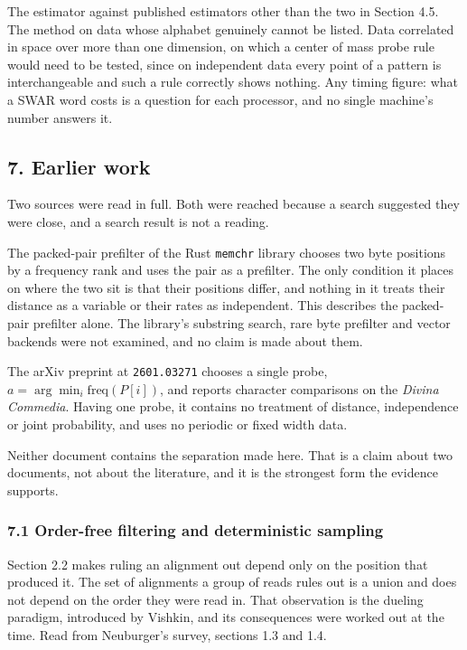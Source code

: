 The estimator against published estimators other than the two in Section 4.5. The method on data whose alphabet genuinely cannot be listed. Data correlated in space over more than one dimension, on which a center of mass probe rule would need to be tested, since on independent data every point of a pattern is interchangeable and such a rule correctly shows nothing. Any timing figure: what a SWAR word costs is a question for each processor, and no single machine's number answers it.

\subsection{7. Earlier work}

Two sources were read in full. Both were reached because a search suggested they were close, and a search result is not a reading.

The packed-pair prefilter of the Rust \texttt{memchr} library chooses two byte positions by a frequency rank and uses the pair as a prefilter. The only condition it places on where the two sit is that their positions differ, and nothing in it treats their distance as a variable or their rates as independent. This describes the packed-pair prefilter alone. The library's substring search, rare byte prefilter and vector backends were not examined, and no claim is made about them.

The arXiv preprint at \texttt{2601.\allowbreak{}03271} chooses a single probe, \(a = \arg\min_i \mathrm{freq}(P[i])\), and reports character comparisons on the \emph{Divina Commedia}. Having one probe, it contains no treatment of distance, independence or joint probability, and uses no periodic or fixed width data.

Neither document contains the separation made here. That is a claim about two documents, not about the literature, and it is the strongest form the evidence supports.


\subsubsection{7.1 Order-free filtering and deterministic sampling}

Section 2.2 makes ruling an alignment out depend only on the position that produced it. The set of alignments a group of reads rules out is a union and does not depend on the order they were read in. That observation is the dueling paradigm, introduced by Vishkin, and its consequences were worked out at the time. Read from Neuburger's survey, sections 1.3 and 1.4.

